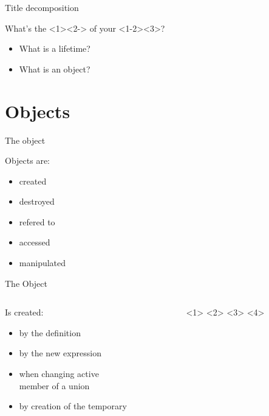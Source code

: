 \documentclass{panicsoftware-presentation}
\makeatletter
\newenvironment{itemizeSeq}{\begin{itemize}[<+-|alert@+>]}{\end{itemize}}
\makeatother
\begin{document}
\begin{frame}{Title decomposition}

\centerline{What's the <1><2-> of your <1-2><3>?}
\pause
\begin{itemizeSeq}
	\item What is a lifetime?
	\item What is an object?
\end{itemizeSeq}

\end{frame}

\section*{Objects}

\begin{frame}{The object}

Objects are:
\begin{itemize}
	\item created
	\item destroyed
	\item refered to
	\item accessed
	\item manipulated
\end{itemize}

\end{frame}

\begin{frame}{The Object}

\begin{columns}[T]
	\begin{column}{0.58\linewidth}
	
	Is created:
	\begin{itemizeSeq}
		\item by the definition
		\item by the new expression
		\item when changing active\\ member of a union
		\item by creation of the temporary
	\end{itemizeSeq}
	\end{column}

	\begin{column}{0.48\linewidth}
	
	\end{column}
\end{columns}


\end{frame}
\end{document}

